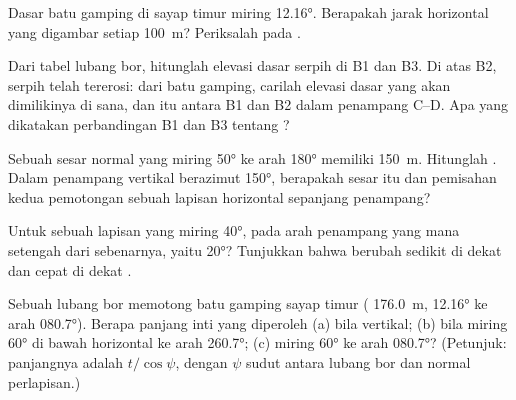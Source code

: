 \begin{exercise}[$\star\star$]\label{exo:b1:cross-sections:7}
Dasar batu gamping di sayap timur miring \ang{12.16}. Berapakah jarak horizontal  yang digambar setiap \qty{100}{m}? Periksalah pada .
\end{exercise}

\begin{exercise}[$\star\star$]\label{exo:b1:cross-sections:8}
Dari tabel lubang bor, hitunglah elevasi dasar serpih di B1 dan B3. Di atas B2, serpih telah tererosi: dari  batu gamping, carilah elevasi dasar yang akan dimilikinya di sana, dan   itu antara B1 dan B2 dalam penampang C--D. Apa yang dikatakan perbandingan B1 dan B3 tentang ?
\end{exercise}

\begin{exercise}[$\star\star$]\label{exo:b1:cross-sections:9}
Sebuah sesar normal yang miring \ang{50} ke arah \ang{180} memiliki  \qty{150}{m}. Hitunglah . Dalam penampang vertikal berazimut \ang{150}, berapakah  sesar itu dan pemisahan kedua pemotongan sebuah lapisan horizontal sepanjang penampang?
\end{exercise}

\begin{exercise}[$\star\star\star$]\label{exo:b1:cross-sections:10}
Untuk sebuah lapisan yang miring \ang{40}, pada arah penampang yang mana  setengah dari  sebenarnya, yaitu \ang{20}? Tunjukkan bahwa  berubah sedikit di dekat  dan cepat di dekat .
\end{exercise}

\begin{exercise}[$\star\star\star$]\label{exo:b1:cross-sections:11}
Sebuah lubang bor memotong batu gamping sayap timur ( \qty{176.0}{m},  \ang{12.16} ke arah \ang{080.7}). Berapa panjang inti yang diperoleh (a) bila vertikal; (b) bila miring \ang{60} di bawah horizontal ke arah \ang{260.7}; (c) miring \ang{60} ke arah \ang{080.7}? (Petunjuk: panjangnya adalah $t/\cos\psi$, dengan $\psi$ sudut antara lubang bor dan normal perlapisan.)
\end{exercise}

